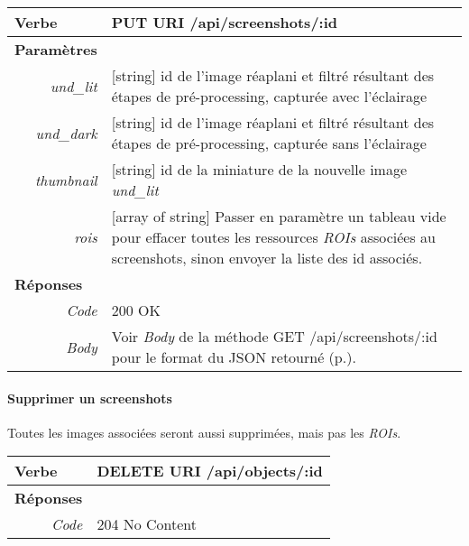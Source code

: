 \begin{appendices}
\begin{absolutelynopagebreak}
\begin{tabular}{@{}p{2cm}p{11.5cm}@{}}
    \toprule
    \textbf{Verbe}                        & PUT \hspace{2.5cm} \textbf{URI} \hspace{0.25cm} /api/screenshots/:id   \\ \midrule
    \textbf{Paramètres}                   &        \\
    \multicolumn{1}{r}{\textit{und\_lit}} & [string] id de l'image réaplani et filtré résultant des étapes de pré-processing, capturée avec l'éclairage  \\ 
    \multicolumn{1}{r}{\textit{und\_dark}} & [string] id de l'image réaplani et filtré résultant des étapes de pré-processing, capturée sans l'éclairage  \\ 
    \multicolumn{1}{r}{\textit{thumbnail}} & [string] id de la miniature de la nouvelle image \emph{und\_lit} \\ 
    \multicolumn{1}{r}{\textit{rois}} & [array of string] Passer en paramètre un tableau vide pour effacer toutes les ressources \emph{ROIs} associées au screenshots, sinon envoyer la liste des id associés. \\ \midrule
    \textbf{Réponses}                     &        \\
    \multicolumn{1}{r}{\textit{Code}}   & 200 OK \\
    \multicolumn{1}{r}{\textit{Body}}   & Voir \emph{Body} de la méthode GET /api/screenshots/:id pour le format du JSON retourné (p.\pageref{jsonHalScreenshots}).
    \\ \bottomrule
\end{tabular}
\end{absolutelynopagebreak}

\begin{absolutelynopagebreak}
\paragraph{Supprimer un screenshots}
Toutes les images associées seront aussi supprimées, mais pas les \emph{ROIs}.

\begin{tabular}{@{}p{2cm}p{11.5cm}@{}}
    \toprule
    \textbf{Verbe}                        & DELETE \hspace{2.5cm} \textbf{URI} \hspace{0.25cm} /api/objects/:id   \\ \midrule
    \textbf{Réponses}                     &        \\
    \multicolumn{1}{r}{\textit{Code}}   & 204 No Content \\ \bottomrule
\end{tabular}
\end{absolutelynopagebreak}
 

\end{appendices}
